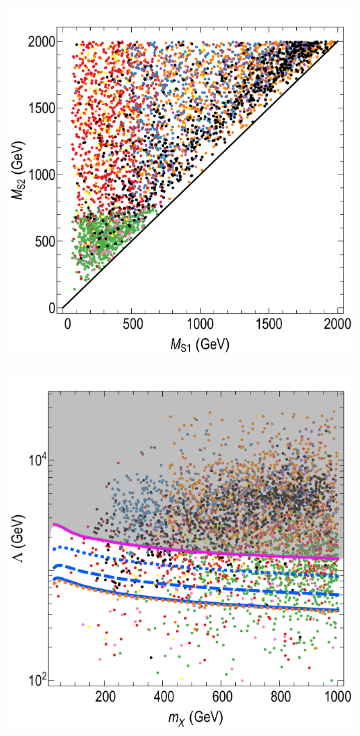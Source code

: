 \begin{figure}[ht]
\centering
\begin{subfigure}[t]{0.45\textwidth}
\includegraphics[width=\textwidth]{texinputs/05_relic/figures/relic_scalar/MS1_MS25.pdf}
\label{fig:scan1e}
\end{subfigure}
\hspace{1em}
\begin{subfigure}[t]{0.45\textwidth}
\includegraphics[width=\textwidth]{texinputs/05_relic/figures/relic_scalar/mDM_Lambda4.pdf}

\end{subfigure}
\end{figure}
